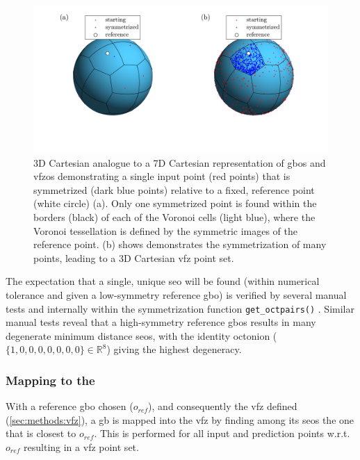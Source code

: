 \documentclass[preprint,12pt]{elsarticle}
\newcommand{\startpt}{red points}
\newcommand{\sympt}{dark blue points}
\newcommand{\refpt}{white circle}
\newcommand{\vbordercolor}{black}
\newcommand{\vcellcolor}{light blue}
\begin{document}
\begin{figure}
    \centering
    \includegraphics[scale=1]{voronoi.png}
    \caption{3D Cartesian analogue to a 7D Cartesian representation of \glspl{gbo} and \glspl{vfzo} demonstrating a single input point (\startpt) that is symmetrized (\sympt) relative to a fixed, reference point (\refpt) (a). Only one symmetrized point is found within the borders (\vbordercolor) of each of the Voronoi cells (\vcellcolor), where the Voronoi tessellation is defined by the symmetric images of the reference point. (b) shows demonstrates the symmetrization of many points, leading to a 3D Cartesian \gls{vfz} point set.}
    \label{fig:voronoi}
\end{figure}

The expectation that a single, unique \gls{seo} will be found (within numerical tolerance and given a low-symmetry reference \gls{gbo}) is verified by several manual tests and internally within the symmetrization function \texttt{get\_octpairs()} \cite{bairdFiveDegreeofFreedom5DOF2020}. Similar manual tests reveal that a high-symmetry reference \glspl{gbo} results in many degenerate minimum distance \glspl{seo}, with the identity octonion ($\{1,0,0,0,0,0,0,0\}\in\mathbb{R}^8$) \cite{francisGeodesicOctonionMetric2019} giving the highest degeneracy.

\subsubsection{Mapping  to the }
\label{sec:methods:proj}


With a reference \gls{gbo} chosen ($o_{ref}$), and consequently the \gls{vfz} defined (\cref{sec:methods:vfz}), a \gls{gb} is mapped into the \gls{vfz} by finding among its \glspl{seo} the one that is closest to $o_{ref}$. This is performed for all input and prediction points w.r.t. $o_{ref}$ resulting in a \gls{vfz} point set.
\end{document}
